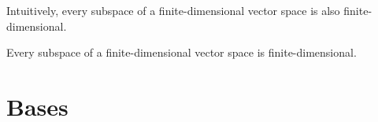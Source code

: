 \documentclass[math0540-lecture-notes.tex]{subfiles}
\begin{document}
Intuitively, every subspace of a finite-dimensional vector space is also finite-dimensional.
\begin{proposition}{}
  Every subspace of a finite-dimensional vector space is finite-dimensional.
\end{proposition}



\section{Bases}





  
\end{document}
